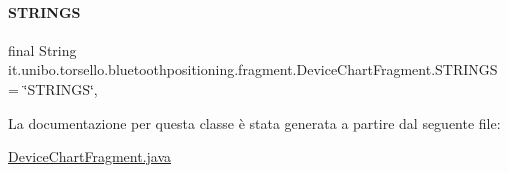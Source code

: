 \hypertarget{classit_1_1unibo_1_1torsello_1_1bluetoothpositioning_1_1fragment_1_1DeviceChartFragment_a2be86b68a5ce90a3ba90b7a214ac47c0_a2be86b68a5ce90a3ba90b7a214ac47c0}{}\label{classit_1_1unibo_1_1torsello_1_1bluetoothpositioning_1_1fragment_1_1DeviceChartFragment_a2be86b68a5ce90a3ba90b7a214ac47c0_a2be86b68a5ce90a3ba90b7a214ac47c0} 
\paragraph{\texorpdfstring{S\+T\+R\+I\+N\+GS}{STRINGS}}
{\footnotesize\ttfamily final String it.\+unibo.\+torsello.\+bluetoothpositioning.\+fragment.\+Device\+Chart\+Fragment.\+S\+T\+R\+I\+N\+GS = \char`\"{}S\+T\+R\+I\+N\+GS\char`\"{}\hspace{0.3cm}{\ttfamily [static]}, {\ttfamily [private]}}



La documentazione per questa classe è stata generata a partire dal seguente file\+:\begin{DoxyCompactItemize}
\item 
\hyperlink{DeviceChartFragment_8java}{Device\+Chart\+Fragment.\+java}\end{DoxyCompactItemize}
